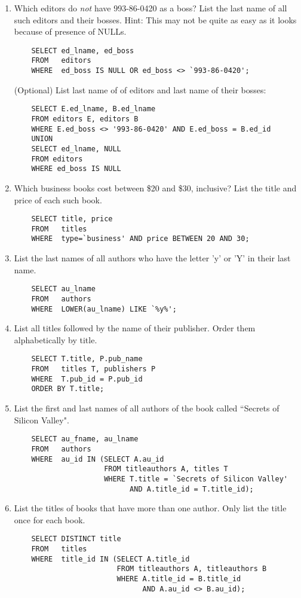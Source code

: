\documentclass{article}
\begin{document}
\begin{enumerate}
\item Which editors do \textit{not} have 993-86-0420 as a boss? List the last name of all such editors and their bosses. Hint: This may not be quite as easy as it looks because of presence of NULLs.
	\begin{verbatim}
	SELECT ed_lname, ed_boss
	FROM   editors
	WHERE  ed_boss IS NULL OR ed_boss <> `993-86-0420';
	\end{verbatim}
	(Optional) List last name of of editors and last name of their bosses:
	\begin{verbatim}
	SELECT E.ed_lname, B.ed_lname
	FROM editors E, editors B
	WHERE E.ed_boss <> '993-86-0420' AND E.ed_boss = B.ed_id
	UNION
	SELECT ed_lname, NULL
	FROM editors
	WHERE ed_boss IS NULL
	\end{verbatim}

\item Which business books cost between \$20 and \$30, inclusive? List the title and price of each such book.
	\begin{verbatim}
	SELECT title, price
	FROM   titles
	WHERE  type=`business' AND price BETWEEN 20 AND 30;
	\end{verbatim}

\item List the last names of all authors who have the letter 'y' or 'Y' in their last name.
	\begin{verbatim}
	SELECT au_lname
	FROM   authors
	WHERE  LOWER(au_lname) LIKE `%y%';
	\end{verbatim}

\item List all titles followed by the name of their publisher. Order them alphabetically by title.
	\begin{verbatim}
	SELECT T.title, P.pub_name
	FROM   titles T, publishers P
	WHERE  T.pub_id = P.pub_id
	ORDER BY T.title;
	\end{verbatim}

\item List the first and last names of all authors of the book called ``Secrets of Silicon Valley".
	\begin{verbatim}
	SELECT au_fname, au_lname
	FROM   authors
	WHERE  au_id IN (SELECT A.au_id
	                 FROM titleauthors A, titles T
	                 WHERE T.title = `Secrets of Silicon Valley' 
	                       AND A.title_id = T.title_id);
	\end{verbatim}

\item List the titles of books that have more than one author. Only list the title once for each book.
	\begin{verbatim}
	SELECT DISTINCT title
	FROM   titles
	WHERE  title_id IN (SELECT A.title_id
	                    FROM titleauthors A, titleauthors B
	                    WHERE A.title_id = B.title_id 
	                          AND A.au_id <> B.au_id);
	\end{verbatim}


\end{enumerate}
\end{document}
